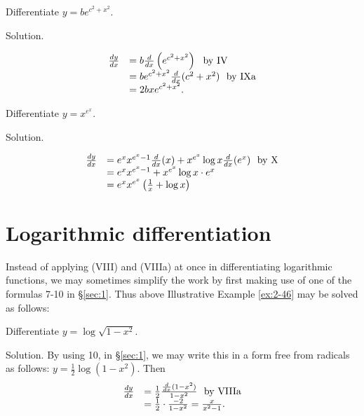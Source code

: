 \begin{example}
{\rm
Differentiate $y = be^{c^2 + x^2}$.

Solution. 

\[
\begin{array}{ll}
	\frac{dy}{dx} 
&=	b\frac{d}{dx} \left ( e^{c^2 + x^2} \right ) \ \ {\rm by\ IV}\\
&  	= be^{c^2 + x^2} \frac{d}{dx} (c^2 + x^2)  \ \ {\rm by\ IXa}\\
&  	= 2bxe^{c^2 + x^2}.
\end{array}
\]
}
\end{example}

\begin{example}
\label{ex:5-46}
{\rm
Differentiate $y = x^{e^x}$.

Solution.

\[
\begin{array}{ll}
	\frac{dy}{dx} 
&	= e^x x^{e^x - 1} \frac{d}{dx} (x) + x^{e^x} \log x \frac{d}{dx} (e^x)  \ \ {\rm by\ X}\\
&  	= e^x x^{e^x - 1} + x^{e^x} \log x \cdot e^x\\
&  	= e^x x^{e^x} \left ( \frac{1}{x} + \log x \right ) 
\end{array}
\]
}
\end{example}

\section{Logarithmic differentiation}

Instead of applying (VIII) and (VIIIa) at once in differentiating logarithmic 
functions, we may sometimes simplify the work by first making use of one 
of the formulas 7-10 in \S \ref{sec:1}. %
Thus above Illustrative Example \ref{ex:2-46} may be solved as follows:


\begin{example}
{\rm
Differentiate $y = \log \sqrt{1 - x^2}$.

Solution. By using 10, in \S \ref{sec:1}, %
we may write this in a form free from radicals as follows:
$  	y 	= \frac{1}{2} \log (1 - x^2)$.
Then 
\[
\begin{array}{ll}
	\frac{dy}{dx} 	
&= \frac{1}{2} \frac{\frac{d}{dx} (1 - x^2)}{1 - x^2}  \ \ {\rm by\ VIIIa}\\
&  	= \frac{1}{2} \cdot \frac{-2}{1 - x^2} = \frac{x}{x^2 - 1}. 
\end{array}
\]
}
\end{example}

